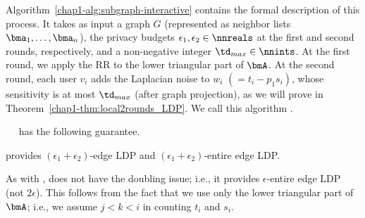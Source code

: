 Algorithm~\ref{chap1-alg:subgraph-interactive} contains the formal
description of this process. 
It takes as input a graph $G$ (represented as neighbor lists $\bma_1, \ldots, \bma_n$), the privacy budgets $\epsilon_1, \epsilon_2 \in \nnreals$ at the first and second rounds, respectively, 
and 
a non-negative integer $\td_{max} \in \nnints$. 
At the first round, we apply the RR to the lower triangular part of $\bmA$. 
At the second round, each user $v_i$ adds the Laplacian noise to $w_i$ $(= t_i - p_1 s _i)$, whose 
sensitivity is at most 
$\td_{max}$ (after graph projection), 
as we will prove in Theorem~\ref{chap1-thm:local2rounds_LDP}. 
We call this algorithm .


\smallskip
{}~~ 
has the following 
guarantee.

\begin{theorem}\label{chap1-thm:local2rounds_LDP}
  provides $(\epsilon_1 + \epsilon_2)$-edge LDP and $(\epsilon_1 + \epsilon_2)$-entire edge LDP.
\end{theorem}

As with ,  does not have the doubling issue; i.e., it provides $\epsilon$-entire edge LDP (not $2\epsilon$). 
This follows from the fact that we 
use only the lower triangular part of $\bmA$; 
i.e., we assume 
$j<k<i$ 
in counting $t_i$ and $s_i$. 

